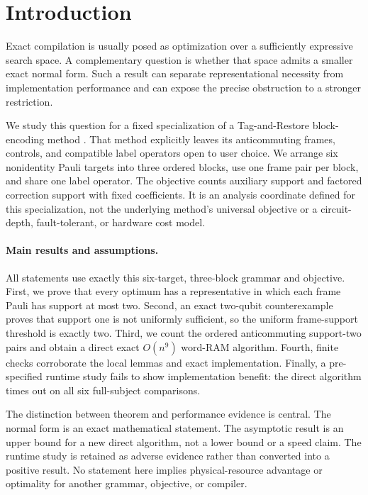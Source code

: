 \section{Introduction}

Exact compilation is usually posed as optimization over a sufficiently expressive search space. A complementary question is whether that space admits a smaller exact normal form. Such a result can separate representational necessity from implementation performance and can expose the precise obstruction to a stronger restriction.

We study this question for a fixed specialization of a Tag-and-Restore block-encoding method \cite{schillo2026blockencoding}. That method explicitly leaves its anticommuting frames, controls, and compatible label operators open to user choice. We arrange six nonidentity Pauli targets into three ordered blocks, use one frame pair per block, and share one label operator. The objective counts auxiliary support and factored correction support with fixed coefficients. It is an analysis coordinate defined for this specialization, not the underlying method's universal objective or a circuit-depth, fault-tolerant, or hardware cost model.

\paragraph{Main results and assumptions.}
All statements use exactly this six-target, three-block grammar and objective. First, we prove that every optimum has a representative in which each frame Pauli has support at most two. Second, an exact two-qubit counterexample proves that support one is not uniformly sufficient, so the uniform frame-support threshold is exactly two. Third, we count the ordered anticommuting support-two pairs and obtain a direct exact $O(n^9)$ word-RAM algorithm. Fourth, finite checks corroborate the local lemmas and exact implementation. Finally, a pre-specified runtime study fails to show implementation benefit: the direct algorithm times out on all six full-subject comparisons.

The distinction between theorem and performance evidence is central. The normal form is an exact mathematical statement. The asymptotic result is an upper bound for a new direct algorithm, not a lower bound or a speed claim. The runtime study is retained as adverse evidence rather than converted into a positive result. No statement here implies physical-resource advantage or optimality for another grammar, objective, or compiler.

